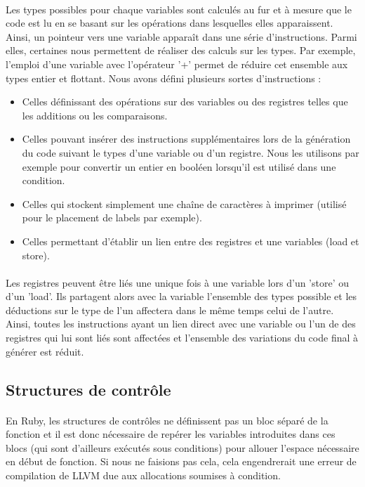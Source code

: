 \documentclass[12pt]{article}
\begin{document}
\paragraph{} Les types possibles pour chaque variables sont calculés au fur et à mesure que
le code est lu en se basant sur les opérations dans lesquelles elles
apparaissent. Ainsi, un pointeur vers une variable apparaît dans une série
d'instructions. Parmi elles, certaines nous permettent de réaliser des
calculs sur les types. Par exemple, l'emploi d'une variable avec l'opérateur
'+' permet de réduire cet ensemble aux types entier et flottant. Nous avons défini plusieurs sortes d'instructions :
\begin{itemize}
	\item Celles définissant des opérations sur des variables ou des registres
		telles que les additions ou les comparaisons.
	\item Celles pouvant insérer des instructions supplémentaires lors de la
		génération du code suivant le types d'une variable ou d'un registre.
		Nous les utilisons par exemple pour convertir un entier en booléen
		lorsqu'il est utilisé dans une condition.
	\item Celles qui stockent simplement une chaîne de caractères à imprimer
		(utilisé pour le placement de labels par exemple).
	\item Celles permettant d'établir un lien entre des registres et une
		variables (load et store).
\end{itemize}

\paragraph{} Les registres peuvent être liés une unique fois à une variable
lors d'un 'store' ou d'un 'load'. Ils partagent alors avec la variable
l'ensemble des types possible et les déductions sur le type de l'un affectera
dans le même temps celui de l'autre. Ainsi, toutes les instructions ayant un
lien direct avec une variable ou l'un de des registres qui lui sont liés sont
affectées et l'ensemble des variations du code final à générer est réduit.

\subsection{Structures de contrôle}

\paragraph{} En Ruby, les structures de contrôles ne définissent pas un bloc séparé de la fonction et il est donc nécessaire de repérer les variables introduites dans ces blocs (qui sont d'ailleurs exécutés sous conditions) pour allouer l'espace nécessaire en début de fonction. Si nous ne faisions pas cela, cela engendrerait une erreur de compilation de LLVM due aux allocations soumises à condition.
\end{document}
